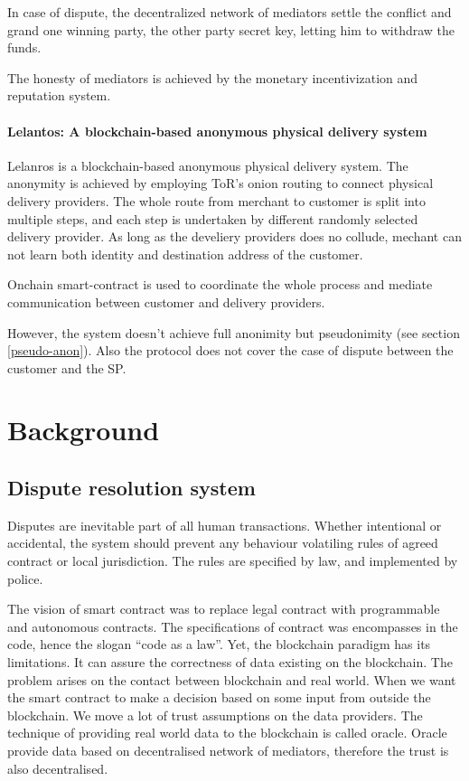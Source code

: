 \documentclass{ieeeaccess}
\begin{document}
In case of dispute, the decentralized network of mediators settle the
conflict and grand one winning party, the other party secret key,
letting him to withdraw the funds.

The honesty of mediators is achieved by the monetary incentivization and
reputation system.


\paragraph{Lelantos: A blockchain-based anonymous physical delivery
system}\label{lelantos-a-blockchain-based-anonymous-physical-delivery-system}

Lelanros\cite{altawy2017lelantos} is a blockchain-based anonymous
physical delivery system. The anonymity is achieved by employing ToR's
onion routing to connect physical delivery providers. The whole route
from merchant to customer is split into multiple steps, and each step is
undertaken by different randomly selected delivery provider. As long as
the develiery providers does no collude, mechant can not learn both
identity and destination address of the customer.

Onchain smart-contract is used to coordinate the whole process and
mediate communication between customer and delivery providers.

However, the system doesn't achieve full anonimity but pseudonimity (see
section \ref{pseudo-anon}). Also the protocol does not
cover the case of dispute between the customer and the SP.

\section{Background}
\subsection{Dispute resolution system}

Disputes are inevitable part of all human transactions. Whether
intentional or accidental, the system should prevent any behaviour
volatiling rules of agreed contract or local jurisdiction. The rules are
specified by law, and implemented by police.

The vision of smart contract was to replace legal contract with
programmable and autonomous contracts. The specifications of contract
was encompasses in the code, hence the slogan ``code as a law''. Yet,
the blockchain paradigm has its limitations. It can assure the
correctness of data existing on the blockchain. The problem arises on
the contact between blockchain and real world. When we want the smart
contract to make a decision based on some input from outside the
blockchain. We move a lot of trust assumptions on the data providers.
The technique of providing real world data to the blockchain is called
oracle. Oracle provide data based on decentralised network of mediators,
therefore the trust is also decentralised.
\end{document}

